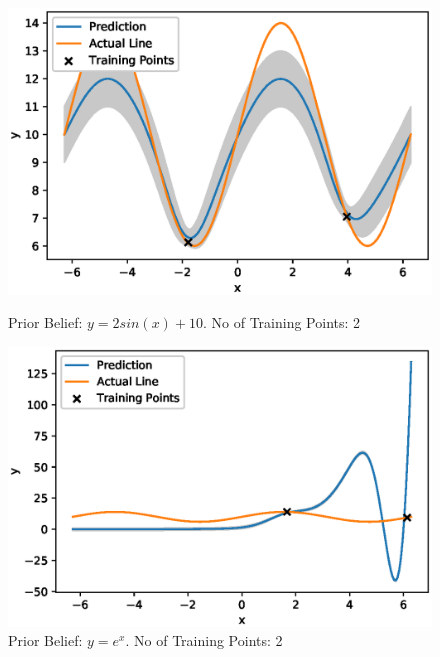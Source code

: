 \begin{figure}[H]
\centering
\begin{minipage}{.5\textwidth}
  \centering
        \includegraphics[width=\textwidth]{images/GP_Explanation/sin_mean_2_training.eps}
        
        \caption{Prior Belief: $y=2sin(x)+10$. No of Training Points: 2}
        \label{fig:gp_plot_y0_2}
\end{minipage}%
\begin{minipage}{.5\textwidth}
  \centering
        \includegraphics[width=\textwidth]{images/GP_Explanation/bad_mean_2_training.eps}
        \caption{Prior Belief: $y=e^x$. No of Training Points: 2}
        \label{fig:gp_plot_y10_2}
\end{minipage}
\end{figure}



